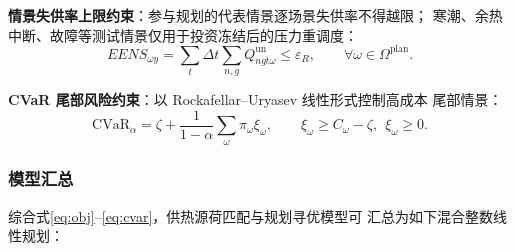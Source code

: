 \textbf{情景失供率上限约束}：参与规划的代表情景逐场景失供率不得越限；
寒潮、余热中断、故障等测试情景仅用于投资冻结后的压力重调度：
\begin{equation}
\label{eq:eens}
EENS_{\omega y}=\sum_{t}\Delta t\sum_{n,g}Q^{\mathrm{un}}_{ngt\omega}
\le\varepsilon_R,\qquad \forall\omega\in\Omega^{\mathrm{plan}}.
\end{equation}

\textbf{CVaR 尾部风险约束}：以 Rockafellar--Uryasev 线性形式控制高成本
尾部情景：
\begin{equation}
\label{eq:cvar}
\mathrm{CVaR}_{\alpha}=\zeta+\frac{1}{1-\alpha}\sum_{\omega}\pi_\omega\xi_\omega,
\qquad
\xi_\omega\ge C_\omega-\zeta,\ \ \xi_\omega\ge 0.
\end{equation}

\subsubsection{模型汇总}

综合式\eqref{eq:obj}--\eqref{eq:cvar}，供热源荷匹配与规划寻优模型可
汇总为如下混合整数线性规划：

